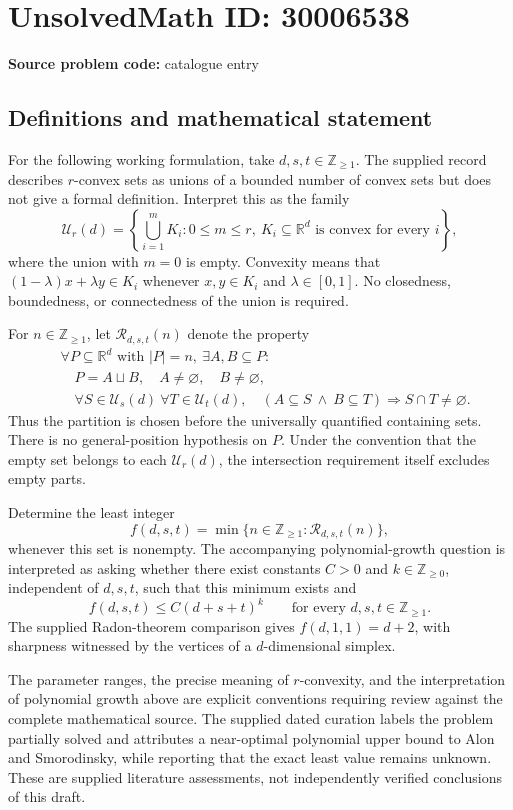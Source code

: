 \documentclass[11pt]{article}
\newcommand{\Z}{\mathbb{Z}}
\newcommand{\R}{\mathbb{R}}
\begin{document}
\section*{UnsolvedMath ID: 30006538}
\textbf{Source problem code:} catalogue entry
\subsection{Definitions and mathematical statement}
For the following working formulation, take \(d,s,t\in\Z_{\geq 1}\). The supplied record describes \(r\)-convex sets as unions of a bounded number of convex sets but does not give a formal definition. Interpret this as the family
\[
\mathcal U_r(d)=\left\{\bigcup_{i=1}^{m}K_i:0\leq m\leq r,\ K_i\subseteq\R^d\text{ is convex for every }i\right\},
\]
where the union with \(m=0\) is empty. Convexity means that \((1-\lambda)x+\lambda y\in K_i\) whenever \(x,y\in K_i\) and \(\lambda\in[0,1]\). No closedness, boundedness, or connectedness of the union is required.

For \(n\in\Z_{\geq1}\), let \(\mathcal R_{d,s,t}(n)\) denote the property
\[
\begin{aligned}
&\forall P\subseteq\R^d\text{ with }|P|=n,\ \exists A,B\subseteq P:\\
&\quad P=A\sqcup B,\quad A\ne\varnothing,\quad B\ne\varnothing,\\
&\quad \forall S\in\mathcal U_s(d)\ \forall T\in\mathcal U_t(d),\quad
(A\subseteq S\ \land\ B\subseteq T)\Longrightarrow S\cap T\ne\varnothing.
\end{aligned}
\]
Thus the partition is chosen before the universally quantified containing sets. There is no general-position hypothesis on \(P\). Under the convention that the empty set belongs to each \(\mathcal U_r(d)\), the intersection requirement itself excludes empty parts.

Determine the least integer
\[
f(d,s,t)=\min\{n\in\Z_{\geq1}:\mathcal R_{d,s,t}(n)\},
\]
whenever this set is nonempty. The accompanying polynomial-growth question is interpreted as asking whether there exist constants \(C>0\) and \(k\in\Z_{\geq0}\), independent of \(d,s,t\), such that this minimum exists and
\[
f(d,s,t)\leq C(d+s+t)^k
\qquad\text{for every }d,s,t\in\Z_{\geq1}.
\]
The supplied Radon-theorem comparison gives \(f(d,1,1)=d+2\), with sharpness witnessed by the vertices of a \(d\)-dimensional simplex.

The parameter ranges, the precise meaning of \(r\)-convexity, and the interpretation of polynomial growth above are explicit conventions requiring review against the complete mathematical source. The supplied dated curation labels the problem partially solved and attributes a near-optimal polynomial upper bound to Alon and Smorodinsky, while reporting that the exact least value remains unknown. These are supplied literature assessments, not independently verified conclusions of this draft.
\end{document}
